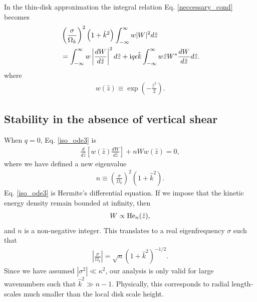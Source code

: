 In the thin-disk approximation the integral relation
Eq. \ref{neccessary_cond} becomes
\begin{align}\label{integral_relation_thin}
 & \left(\frac{\sigma}{\Omega_k}\right)^2\left(1+\hat{k}^2\right)
  \int_{-\infty}^{\infty}w|W|^2d\hat{z}  \notag\\ 
  & =\int_{-\infty}^{\infty}w\left|\frac{dW}{d\hat{z}}\right|^2d\hat{z}
  +\mathrm{i} q \epsilon
  \hat{k}\int_{-\infty}^{\infty}w\hat{z}W^*\frac{dW}{d\hat{z}}d\hat{z}.    
\end{align}
where 
\begin{align}
  w(\hat{z}) \equiv \exp{\left(-\frac{\hat{z}^2}{2}\right)}.  
\end{align}


\subsection{Stability in the absence of vertical shear}
When $q=0$, Eq. \ref{iso_ode3} is
\begin{align}\label{hermite_ode}
  \frac{d}{d\hat{z}}\left[w(\hat{z})\frac{dW}{d\hat{z}}\right] + nW
  w(\hat{z}) =0, 
\end{align}
where we have defined a new eigenvalue
\begin{align}
  n \equiv \left(\frac{\sigma}{\Omega_k}\right)^2(1+\hat{k}^2). 
\end{align} 
Eq. \ref{iso_ode3} is Hermite's differential equation. If we impose
that the kinetic energy density remain bounded at infinity, then  
\begin{align}
  W \propto \operatorname{He}_n(\hat{z}),
\end{align}
and $n$ is a non-negative integer. This translates to a real
eigenfrequency $\sigma$ such that
\begin{align}
  \left|\frac{\sigma}{\Omega_k}\right| = \sqrt{n}
  \left(1+\hat{k}^2\right)^{-1/2}. 
\end{align}
Since we have assumed $|\sigma^2|\ll \kappa^2$, our analysis is only
valid for large wavenumbers such that $\hat{k}^2\gg 
n-1$. Physically, this corresponds to radial length-scales much
smaller than the local disk scale height. 

